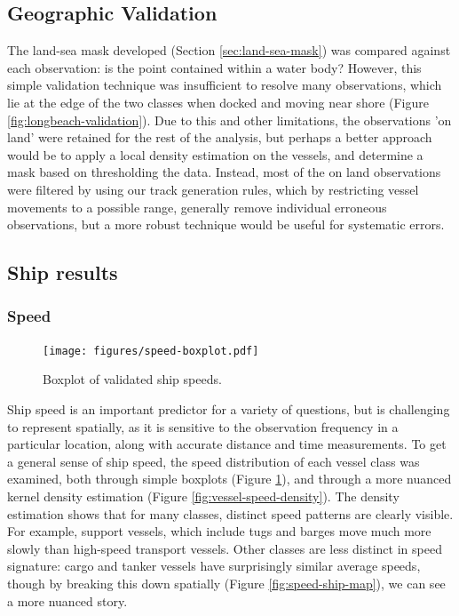 \documentclass[12pt,letterpaper]{article}
\begin{document}
\subsection{Geographic Validation}

The land-sea mask developed (Section \ref{sec:land-sea-mask}) was compared against each observation: is the point contained within a water body? However, this simple validation technique was insufficient to resolve many observations, which lie at the edge of the two classes when docked %
 and moving near shore %
(Figure \ref{fig:longbeach-validation}). Due to this and other limitations, the observations 'on land' were retained for the rest of the analysis, but perhaps a better approach would be to apply a local density estimation on the vessels, and determine a mask based on thresholding the data. Instead, most of the on land observations were filtered by using our track generation rules, which by restricting vessel movements to a possible range, generally remove individual erroneous observations, but a more robust technique would be useful for systematic errors.


\subsection{Ship results}

\subsubsection{Speed}
\begin{figure}[htbp]
  \centering
  \texttt{[image: figures/speed-boxplot.pdf]}
  \caption{Boxplot of validated ship speeds.}
  \label{fig:vessel-speed-boxplot} %
\end{figure}

Ship speed is an important predictor for a variety of questions, but is challenging to represent spatially, as it is sensitive to the observation frequency in a particular location, along with accurate distance and time measurements. To get a general sense of ship speed, the speed distribution of each vessel class was examined, both through simple boxplots (Figure \ref{fig:vessel-speed-boxplot}), and through a more nuanced kernel density estimation (Figure \ref{fig:vessel-speed-density}). The density estimation shows that for many classes, distinct speed patterns are clearly visible. For example, support vessels, which include tugs and barges move much more slowly than high-speed transport vessels. Other classes are less distinct in speed signature: cargo and tanker vessels have surprisingly similar average speeds, though by breaking this down spatially (Figure \ref{fig:speed-ship-map}), we can see a more nuanced story.
\end{document}
